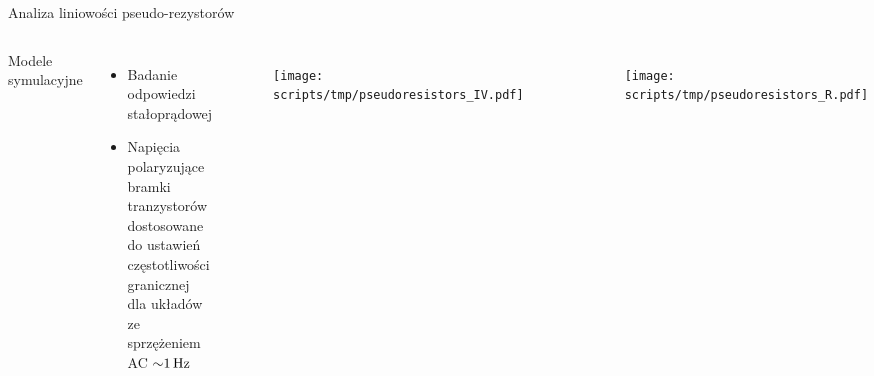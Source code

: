 \begin{frame}{Analiza liniowości pseudo-rezystorów}
\begin{columns}
\begin{block}{Modele symulacyjne}
\end{block}
        \begin{itemize}
            \item Badanie odpowiedzi stałoprądowej  
            \item Napięcia polaryzujące bramki tranzystorów dostosowane do ustawień częstotliwości granicznej dla układów ze sprzężeniem AC $\SI{\sim 1}{\hertz}$

        \end{itemize}
    \begin{columns}

        \begin{figure}[H]
            \centering
            \texttt{[image: scripts/tmp/pseudoresistors\_IV.pdf]}
        \end{figure}


        \begin{figure}[H]
            \centering
            \texttt{[image: scripts/tmp/pseudoresistors\_R.pdf]}
        \end{figure}

    \end{columns}
\end{columns}


\end{frame}

